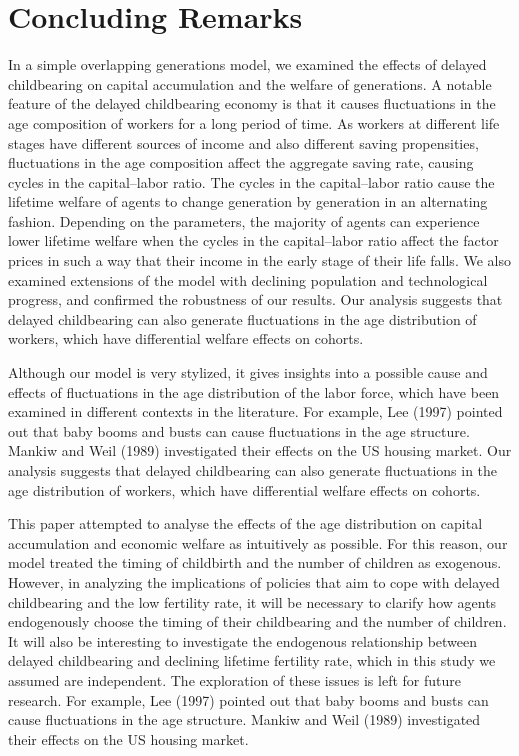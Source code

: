 \documentclass[nogrid]{MBE}%
\begin{document}
{\section{Concluding Remarks\label{sec:Conclusion}}

In a simple overlapping generations model, we examined the effects of delayed childbearing on
capital accumulation and the welfare of generations. A notable feature of the delayed childbearing
economy is that it causes fluctuations in the age composition of workers for a long period of
time. As workers at different life stages have different sources of income and also different
saving propensities, fluctuations in the age composition affect the aggregate saving rate, causing
cycles in the capital--labor ratio. The cycles in the capital--labor ratio cause the lifetime
welfare of agents to change generation by generation in an alternating fashion. Depending on the
parameters, the majority of agents can experience lower lifetime welfare when the cycles in the
capital--labor ratio affect the factor prices in such a way that their income in the early stage
of their life falls. We also examined extensions of the model with declining population and
technological progress, and confirmed the robustness of our results. Our analysis suggests that
delayed childbearing can also generate fluctuations in the age distribution of workers, which have
differential welfare effects on cohorts.

Although our model is very stylized, it gives insights into a possible cause
and effects of fluctuations in the age distribution of the labor force, which
have been examined in different contexts in the literature. For example, Lee
(1997) pointed out that baby booms and busts can cause fluctuations in the age
structure. Mankiw and Weil (1989) investigated their effects on the US housing
market. Our analysis suggests that delayed childbearing can also generate
fluctuations in the age distribution of workers, which have differential
welfare effects on cohorts.

This paper attempted to analyse the effects of the age distribution on capital accumulation and
economic welfare as intuitively as possible. For this reason, our model treated the timing of
childbirth and the number of children as exogenous. However, in analyzing the implications of
policies that aim to cope with delayed childbearing and the low fertility rate, it will be
necessary to clarify how agents endogenously choose the timing of their childbearing and the
number of children. It will also be interesting to investigate the endogenous relationship between
delayed childbearing and declining lifetime fertility rate, which in this study we assumed are
independent. The exploration of these issues is left for future research. For example, Lee (1997)
pointed out that baby booms and busts can cause fluctuations in the age structure. Mankiw and Weil
(1989) investigated their effects on the US housing market.


}
\end{document}
